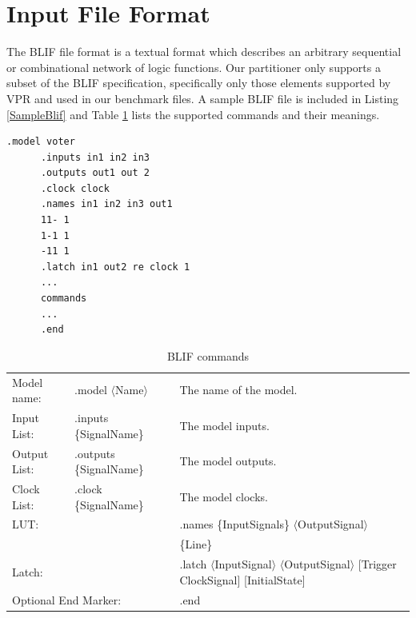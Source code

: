\documentclass[12pt,final,oneside,a4paper]{dwThesis} %
\begin{document}
   \section{Input File Format}
   \label{secBlif} The \gls{BLIF} file format is a
   textual format which describes an arbitrary sequential or combinational
   network of logic functions\cite{BLIF}.  Our partitioner only supports a
   subset of the \gls{BLIF} specification, specifically only those elements
   supported by \gls{VPR} and used in our benchmark files.
   A sample \gls{BLIF} file is included in Listing \ref{SampleBlif} and 
   Table \ref{BLIFCommands} lists the supported commands and their meanings.
\begin{table}
      \begin{center}
   \begin{lstlisting}[caption=BLIF file layout, label=SampleBlif]
   .model voter
      .inputs in1 in2 in3
      .outputs out1 out 2
      .clock clock
      .names in1 in2 in3 out1
      11- 1
      1-1 1
      -11 1
      .latch in1 out2 re clock 1
      ...  
      commands 
      ...  
      .end
   \end{lstlisting}
\end{center}\end{table}


\begin{table}
      \begin{center}
   \begin{tabular}
      {lll} Model name: & .model $\langle$Name$\rangle$ & The name
      of the model.\\
      Input List: & .inputs \{SignalName\} & The model inputs.\\

      Output List:& .outputs \{SignalName\} & The model outputs.\\
      Clock List: &
      .clock \{SignalName\} & The model clocks.\\

      \multicolumn{2}{l}{\gls{LUT}:} & .names \{InputSignals\}
      $\langle$OutputSignal$\rangle$\\
      &&\{Line\}\\
      \multicolumn{2}{l}{Latch:}
      & .latch $\langle$InputSignal$\rangle$ $\langle$OutputSignal$\rangle$
      [Trigger ClockSignal] [InitialState]\\
      \multicolumn{2}{l}{Optional End Marker:} &
      .end 
   \end{tabular}
   \caption{\gls{BLIF} commands}\label{BLIFCommands}
\end{center}\end{table}
\end{document}
